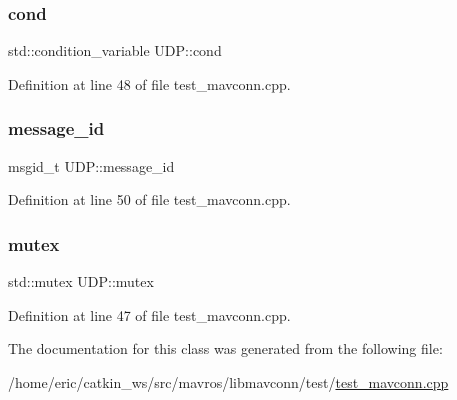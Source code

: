 \subsubsection{\texorpdfstring{cond}{cond}}
{\footnotesize\ttfamily std\+::condition\+\_\+variable U\+D\+P\+::cond}



Definition at line 48 of file test\+\_\+mavconn.\+cpp.

\mbox{\label{classUDP_abfbcb22c717445e6faf45a4294a785b4}} 
\subsubsection{\texorpdfstring{message\_id}{message\_id}}
{\footnotesize\ttfamily msgid\+\_\+t U\+D\+P\+::message\+\_\+id}



Definition at line 50 of file test\+\_\+mavconn.\+cpp.

\mbox{\label{classUDP_a6e56ea42dfab1be814356dfea9b4c410}} 
\subsubsection{\texorpdfstring{mutex}{mutex}}
{\footnotesize\ttfamily std\+::mutex U\+D\+P\+::mutex}



Definition at line 47 of file test\+\_\+mavconn.\+cpp.



The documentation for this class was generated from the following file\+:\begin{DoxyCompactItemize}
\item 
/home/eric/catkin\+\_\+ws/src/mavros/libmavconn/test/\mbox{\hyperlink{test__mavconn_8cpp}{test\+\_\+mavconn.\+cpp}}\end{DoxyCompactItemize}
